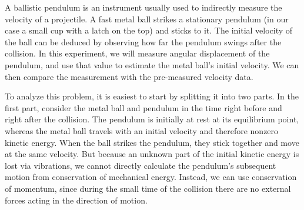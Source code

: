 


A ballistic pendulum is an instrument usually used to indirectly measure the velocity of a projectile. A fast metal ball strikes a stationary pendulum (in our case a small cup with a latch on the top) and sticks to it. The initial velocity of the ball can be deduced by observing how far the pendulum swings after the collision. In this experiment, we will measure angular displacement of the pendulum, and use that value to estimate the metal ball's initial velocity. We can then compare the measurement with the pre-measured velocity data. %

To analyze this problem, it is easiest to start by splitting it into two parts. In the first part, consider the metal ball and pendulum in the time right before and right after the collision. The pendulum is initially at rest at its equilibrium point, whereas the metal ball travels with an initial velocity and therefore nonzero kinetic energy. When the ball strikes the pendulum, they stick together and move at the same velocity. But because an unknown part of the initial kinetic energy is lost via vibrations, we cannot directly calculate the pendulum's subsequent motion from conservation of mechanical energy.  Instead, we can use conservation of momentum, since during the small time of the collision there are no external forces acting in the direction of motion.\myskip

